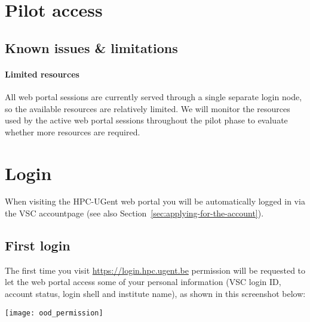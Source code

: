 \section*{Pilot access}




\subsection{Known issues \& limitations}

\paragraph{Limited resources}

All web portal sessions are currently served through a single separate login node,
so the available resources are relatively limited.
We will monitor the resources used by the active web portal sessions throughout the pilot
phase to evaluate whether more resources are required.

\section{Login}

When visiting the HPC-UGent web portal you will be automatically logged in via the VSC accountpage
(see also Section~\ref{sec:applying-for-the-account}).

\subsection{First login}

The first time you visit \url{https://login.hpc.ugent.be} permission will be requested to let the web portal 
access some of your personal information (VSC login ID, account status, login shell and institute name),
as shown in this screenshot below:

\begin{center}
    \texttt{[image: ood\_permission]}
\end{center}

